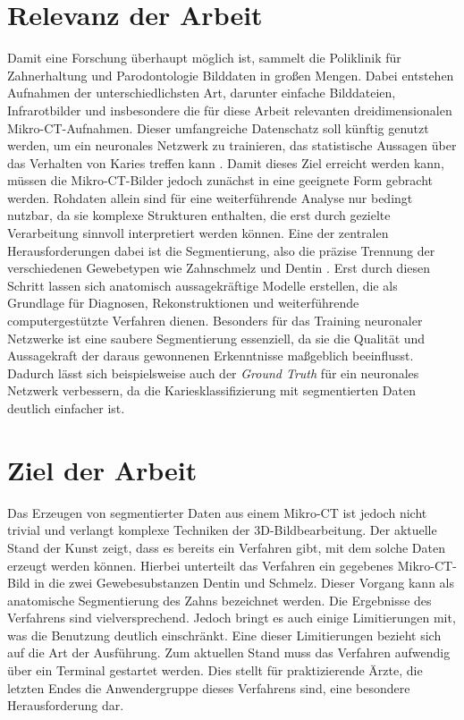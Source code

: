 \section{Relevanz der Arbeit}
\label{sec:relevanz_der_arbeit} Damit eine Forschung überhaupt möglich ist, sammelt
die Poliklinik für Zahnerhaltung und Parodontologie Bilddaten in großen Mengen.
Dabei entstehen Aufnahmen der unterschiedlichsten Art, darunter einfache Bilddateien,
Infrarotbilder und insbesondere die für diese Arbeit relevanten
dreidimensionalen Mikro-\ac{CT}-Aufnahmen. Dieser umfangreiche Datenschatz soll
künftig genutzt werden, um ein neuronales Netzwerk zu trainieren, das
statistische Aussagen über das Verhalten von Karies treffen kann \citep[vgl.][S.~1]{walter2025projekt}.
Damit dieses Ziel erreicht werden kann, müssen die Mikro-\ac{CT}-Bilder jedoch
zunächst in eine geeignete Form gebracht werden. Rohdaten allein sind für eine weiterführende
Analyse nur bedingt nutzbar, da sie komplexe Strukturen enthalten, die erst durch
gezielte Verarbeitung sinnvoll interpretiert werden können. Eine der zentralen
Herausforderungen dabei ist die Segmentierung, also die präzise Trennung der verschiedenen
Gewebetypen wie Zahnschmelz und Dentin \citep[vgl.][S.~359]{lehmann2013bildverarbeitung}.
Erst durch diesen Schritt lassen sich anatomisch aussagekräftige Modelle erstellen,
die als Grundlage für Diagnosen, Rekonstruktionen und weiterführende computergestützte
Verfahren dienen. Besonders für das Training neuronaler Netzwerke ist eine
saubere Segmentierung essenziell, da sie die Qualität und Aussagekraft der daraus
gewonnenen Erkenntnisse maßgeblich beeinflusst. Dadurch lässt sich
beispielsweise auch der \textit{Ground Truth} für ein neuronales Netzwerk verbessern,
da die Kariesklassifizierung mit segmentierten Daten deutlich einfacher ist.

\section{Ziel der Arbeit}
\label{sec:ziel_der_arbeit} Das Erzeugen von segmentierter Daten aus einem Mikro-\ac{CT}
ist jedoch nicht trivial und verlangt komplexe Techniken der \ac{3D}-Bildbearbeitung.
Der aktuelle Stand der Kunst zeigt, dass es bereits ein Verfahren gibt, mit dem solche
Daten erzeugt werden können. Hierbei unterteilt das Verfahren ein gegebenes
Mikro-\ac{CT}-Bild in die zwei Gewebesubstanzen Dentin und Schmelz. Dieser
Vorgang kann als anatomische Segmentierung des Zahns bezeichnet werden. Die Ergebnisse
des Verfahrens sind vielversprechend. Jedoch bringt es auch einige Limitierungen
mit, was die Benutzung deutlich einschränkt. Eine dieser Limitierungen bezieht
sich auf die Art der Ausführung. Zum aktuellen Stand muss das Verfahren aufwendig
über ein Terminal gestartet werden. Dies stellt für praktizierende Ärzte, die letzten
Endes die Anwendergruppe dieses Verfahrens sind, eine besondere Herausforderung
dar.

